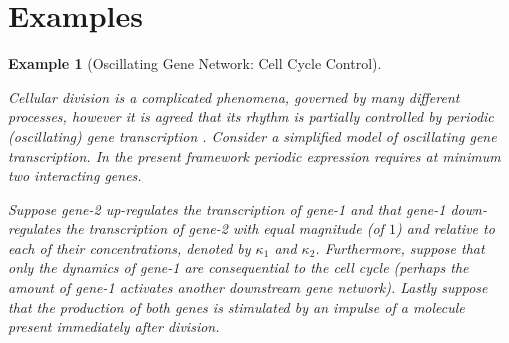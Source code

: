 \documentclass{article}
\newcommand{\1}{\mathbbm{1}}
\newtheorem{example}{Example}
\begin{document}
\section*{Examples}
  \begin{example}[Oscillating Gene Network: Cell Cycle Control]\label{ex:oscillator}


    Cellular division is a complicated phenomena, governed by many different processes, however it is agreed that its rhythm is partially controlled by periodic (oscillating) gene transcription \citep{orlando2008global}. Consider a simplified model of oscillating gene transcription. In the present framework periodic expression requires at minimum two interacting genes. 

    Suppose gene-2 up-regulates the transcription of gene-1 and that gene-1 down-regulates the transcription of gene-2 with equal magnitude (of $1$) and relative to each of their concentrations, denoted by $\kappa_{1}$ and $\kappa_{2}$. Furthermore, suppose that only the dynamics of gene-1 are consequential to the cell cycle (perhaps the amount of gene-1 activates another downstream gene network). Lastly suppose that the production of both genes is stimulated by an impulse of a molecule present immediately after division.


\end{example}
\end{document}
